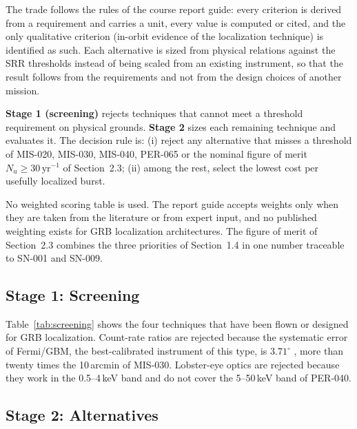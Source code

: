 The trade follows the rules of the course report guide: every criterion is derived from a
requirement and carries a unit, every value is computed or cited, and the only qualitative
criterion (in-orbit evidence of the localization technique) is identified as such. Each
alternative is sized from physical relations against the SRR thresholds instead of being
scaled from an existing instrument, so that the result follows from the requirements and
not from the design choices of another mission.

\textbf{Stage 1 (screening)} rejects techniques that cannot meet a threshold requirement on
physical grounds. \textbf{Stage 2} sizes each remaining technique and evaluates it. The
decision rule is: (i) reject any alternative that misses a threshold of MIS-020, MIS-030,
MIS-040, PER-065 or the nominal figure of merit $N_u\ge30\,\mathrm{yr^{-1}}$ of
Section~2.3; (ii) among the rest, select the lowest cost per usefully localized burst.

No weighted scoring table is used. The report guide accepts weights only when they are
taken from the literature or from expert input, and no published weighting exists for GRB
localization architectures. The figure of merit of Section~2.3 combines the three
priorities of Section~1.4 in one number traceable to SN-001 and SN-009.

\subsection{Stage 1: Screening}

Table~\ref{tab:screening} shows the four techniques that have been flown or designed for
GRB localization. Count-rate ratios are rejected because the systematic error of
Fermi/GBM, the best-calibrated instrument of this type, is $3.71^\circ$
\cite{Connaughton2015}, more than twenty times the 10\,arcmin of MIS-030. Lobster-eye
optics are rejected because they work in the 0.5--4\,keV band \cite{Yuan2022} and do not
cover the 5--50\,keV band of PER-040.



\subsection{Stage 2: Alternatives}

